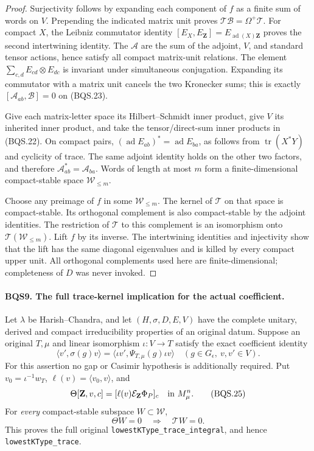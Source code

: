\documentclass[11pt,a4paper]{article}
\numberwithin{equation}{section}
\theoremstyle{remark}\newtheorem{remark}[theorem]{Remark}
\begin{document}
\begin{proof}
Surjectivity follows by expanding each component of $f$ as a finite sum
of words on $V$.  Prepending the indicated matrix unit proves
$\mathcal T\mathcal B=\Omega^+\mathcal T$.
For compact $X$, the Leibniz commutator identity
$[E_X,E_{\mathbf Z}]=E_{\operatorname{ad}(X)\mathbf Z}$
proves the second intertwining identity.
The $\mathcal A$ are the sum of the adjoint, $V$, and standard tensor
actions, hence satisfy all compact matrix-unit relations.
The element $\sum_{c,d}E_{cd}\otimes E_{dc}$ is invariant under
simultaneous conjugation.  Expanding its commutator with a matrix unit
cancels the two Kronecker sums; this is exactly
$[\mathcal A_{ab},\mathcal B]=0$ on (BQS.23).

Give each matrix-letter space its Hilbert--Schmidt inner product, give
$V$ its inherited inner product, and take the tensor/direct-sum inner
products in (BQS.22).  On compact pairs,
$(\operatorname{ad}E_{ab})^*=\operatorname{ad}E_{ba}$,
as follows from $\operatorname{tr}(X^*Y)$ and cyclicity of trace.
The same adjoint identity holds on the other two factors, and therefore
$\mathcal A_{ab}^*=\mathcal A_{ba}$.
Words of length at most $m$ form a finite-dimensional compact-stable
space $\mathcal W_{\le m}$.

Choose any preimage of $f$ in some $\mathcal W_{\le m}$.
The kernel of $\mathcal T$ on that space is compact-stable.  Its
orthogonal complement is also compact-stable by the adjoint identities.
The restriction of $\mathcal T$ to this complement is an isomorphism
onto $\mathcal T(\mathcal W_{\le m})$.
Lift $f$ by its inverse.  The intertwining identities and injectivity
show that the lift has the same diagonal eigenvalues and is killed
by every compact upper unit.  All orthogonal complements used here
are finite-dimensional; completeness of $D$ was never invoked.
\end{proof}

\paragraph{BQS9. The full trace-kernel implication for the actual coefficient.}
\label{claim:BQS9}
Let $\lambda$ be Harish--Chandra, and let $(H,\sigma,D,E,V)$
have the complete unitary, derived and compact irreducibility
properties of an original datum.  Suppose an original
$T,\mu$ and linear isomorphism $\iota:V\to T$ satisfy the exact coefficient
identity
\[
 \langle v',\sigma(g)v\rangle
       =\langle\iota v',\Psi_{T,\mu}(g)\iota v\rangle
       \quad(g\in G_\epsilon,\ v,v'\in V).
 \tag{BQS.24}
\]
For this assertion no gap or Casimir hypothesis is additionally required.
Put $v_0=\iota^{-1}w_T$, $\ell(v)=\langle v_0,v\rangle$, and
\[
 \Theta[\mathbf Z,v,c]
       =[\ell(v)\mathcal E_{\mathbf Z}\Phi_P]_c
                   \quad\hbox{in }M_\mu^n.
 \tag{BQS.25}
\]
For \emph{every} compact-stable subspace $W\subset\mathcal W$,
\[
                    \Theta W=0\quad\Longrightarrow\quad\mathcal T W=0.
 \tag{BQS.26}
\]
This proves the full original \texttt{lowest\allowbreak KType\_\allowbreak trace\_\allowbreak integral},
and hence \texttt{lowest\allowbreak KType\_\allowbreak trace}.
\end{document}
